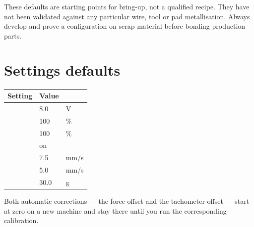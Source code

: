 \begin{wbwarning}
These defaults are starting points for bring-up, not a qualified recipe. They
have not been validated against any particular wire, tool or pad metallisation.
Always develop and prove a configuration on scrap material before bonding
production parts.
\end{wbwarning}

\section{Settings defaults}

\begin{center}\small
\begin{tabular}{@{}L{34mm}R{20mm}L{12mm}@{}}
\toprule
\textbf{Setting} & \textbf{Value} & \\
\midrule
{}  & 8.0   & V \\
  & 100   & \% \\
   & 100   & \% \\
     & on    & \\
    & 7.5   & mm/s \\
  & 5.0   & mm/s \\
 & 30.0  & g \\
\bottomrule
\end{tabular}
\end{center}

Both automatic corrections --- the force offset and the tachometer offset ---
start at zero on a new machine and stay there until you run the corresponding
calibration.

